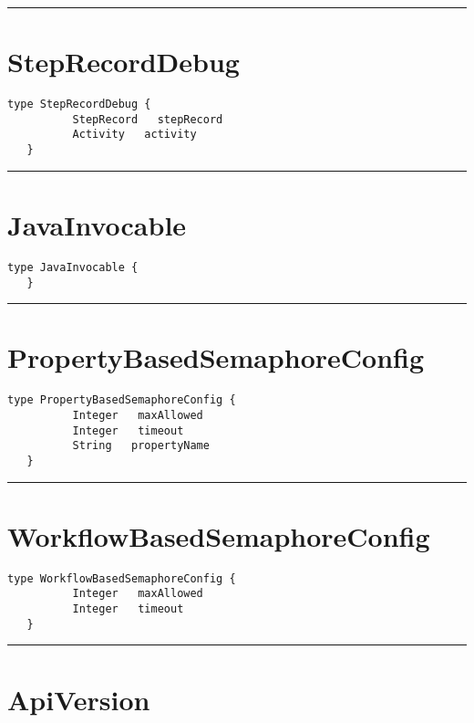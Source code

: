 \rule{12cm}{2pt}
\section{StepRecordDebug}
\label{type:StepRecordDebug}

\begin{lstlisting}[style=nonumbers]
   type StepRecordDebug {
          StepRecord   stepRecord
          Activity   activity
   }
\end{lstlisting}

\rule{12cm}{2pt}
\section{JavaInvocable}
\label{type:JavaInvocable}

\begin{lstlisting}[style=nonumbers]
   type JavaInvocable {
   }
\end{lstlisting}

\rule{12cm}{2pt}
\section{PropertyBasedSemaphoreConfig}
\label{type:PropertyBasedSemaphoreConfig}

\begin{lstlisting}[style=nonumbers]
   type PropertyBasedSemaphoreConfig {
          Integer   maxAllowed
          Integer   timeout
          String   propertyName
   }
\end{lstlisting}

\rule{12cm}{2pt}
\section{WorkflowBasedSemaphoreConfig}
\label{type:WorkflowBasedSemaphoreConfig}

\begin{lstlisting}[style=nonumbers]
   type WorkflowBasedSemaphoreConfig {
          Integer   maxAllowed
          Integer   timeout
   }
\end{lstlisting}

\rule{12cm}{2pt}
\section{ApiVersion}
\label{type:ApiVersion}

